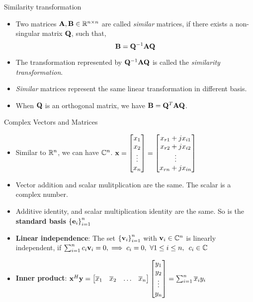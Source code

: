 \documentclass[aspectratio=169]{beamer}
\let\olditem\item
\renewcommand{\item}{\setlength{\itemsep}{\fill}\olditem}
\def\mf{\ensuremath\mathbf}
\def\mb{\ensuremath\mathbb}
\begin{document}
\begin{frame}[t]{Similarity transformation}
\begin{itemize}
    \item Two matrices $\mf{A}, \mf{B} \in \mb{R}^{n \times n}$ are called \textit{similar} matrices, if there exists a non-singular matrix $\mf{Q}$, such that,
    \[ \mf{B} = \mf{Q}^{-1}\mf{A}\mf{Q} \]

    \item The transformation represented by $\mf{Q}^{-1}\mf{A}\mf{Q}$ is called the \textit{similarity transformation}.

    \item \textit{Similar} matrices represent the same linear transformation in different basis.

    \item When $\mf{Q}$ is an orthogonal matrix, we have $\mf{B} = \mf{Q}^T\mf{A}\mf{Q}$. 
\end{itemize}
\end{frame}


\begin{frame}[t]{Complex Vectors and Matrices}
\begin{itemize}
    \item Similar to $\mb{R}^n$, we can have $\mb{C}^n$. $\mf{x} = \begin{bmatrix*}x_{1}\\x_{2}\\\vdots\\x_{n}\end{bmatrix*} = \begin{bmatrix*}x_{r1} + jx_{i1}\\x_{r2} + jx_{i2}\\\vdots\\x_{rn} + jx_{in}\end{bmatrix*}$
    
    \item Vector addition and scalar mulitplication are the same. The scalar is a complex number.
    
    \item Additive identity, and scalar multiplication identity are the same. So is the \textbf{standard basis} $\left\{\mf{e}_i\right\}_{i=1}^{n}$
    
    \item \textbf{Linear independence}: The set $\left\{\mf{v}_i\right\}_{i=1}^n$ with $\mf{v}_i \in \mb{C}^n$ is linearly independent, if  $\sum_{i=1}^nc_i\mf{v}_i = 0, \implies c_i = 0, \,\, \forall 1 \leq i \leq n, \,\,\, c_i \in \mb{C}$
    
    \item \textbf{Inner product}: $\mf{x}^H\mf{y} = \begin{bmatrix*}\overline{x}_1&\overline{x}_2&\ldots&\overline{x}_n\end{bmatrix*}\begin{bmatrix*}y_1\\y_2\\\vdots\\y_n\end{bmatrix*} = \sum_{i=1}^n\overline{x}_iy_i$

\end{itemize}
\end{frame}
\end{document}
